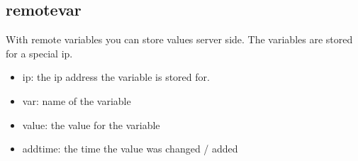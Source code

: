 \subsection{remotevar}
With remote variables you can store values server side. The variables are stored for a special ip.
\begin{itemize}
\item ip: the ip address the variable is stored for.
\item var: name of the variable
\item value: the value for the variable
\item addtime: the time the value was changed / added
\end{itemize}
